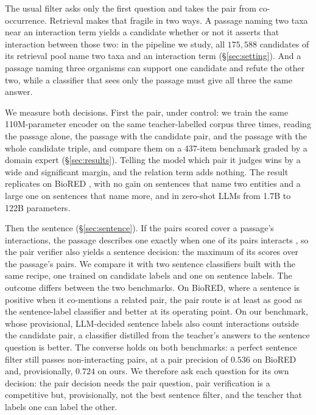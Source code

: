 \documentclass[11pt]{article}
\begin{document}
The usual filter asks only the first question and takes the pair from co-occurrence. Retrieval makes
that fragile in two ways. A passage naming two taxa near an interaction term yields a candidate
whether or not it asserts that interaction between those two: in the pipeline we study, all
$175{,}588$ candidates of its retrieval pool name two taxa and an interaction term
(\S\ref{sec:setting}). And a passage naming three organisms can support one candidate and refute the
other two, while a classifier that sees only the passage must give all three the same answer.

We measure both decisions. First the pair, under control: we train the same 110M-parameter encoder
on the same teacher-labelled corpus three times, reading the passage alone, the passage with the
candidate pair, and the passage with the whole candidate triple, and compare them on a 437-item
benchmark graded by a domain expert (\S\ref{sec:results}). Telling the model which pair it judges
wins by a wide and significant margin, and the relation term adds nothing. The result replicates on
BioRED \citep{luo2022biored}, with no gain on sentences that name two entities and a large one on
sentences that name more, and in zero-shot LLMs from 1.7B to 122B parameters.

Then the sentence (\S\ref{sec:sentence}). If the pairs scored cover a passage's interactions, the
passage describes one exactly when one of its pairs interacts \citep{dietterich1997solving}, so the
pair verifier also yields a sentence decision: the maximum of its scores over the passage's
pairs. We compare it with two sentence classifiers built with the same recipe, one trained
on candidate labels and one on sentence labels. The outcome differs between the two
benchmarks. On BioRED, where a sentence is positive when it co-mentions a related pair, the pair route
is at least as good as the sentence-label classifier and better at its operating point. On our
benchmark, whose provisional, LLM-decided sentence labels also count interactions outside the
candidate pair, a classifier distilled from the teacher's answers to the sentence question is
better. The converse holds on both benchmarks: a perfect sentence filter still passes
non-interacting pairs, at a pair precision of $0.536$ on BioRED and, provisionally, $0.724$ on ours.
We therefore ask each question for its own decision: the pair decision needs the pair question,
pair verification is a competitive but, provisionally, not the best sentence filter, and the teacher
that labels one can label the other.
\end{document}
